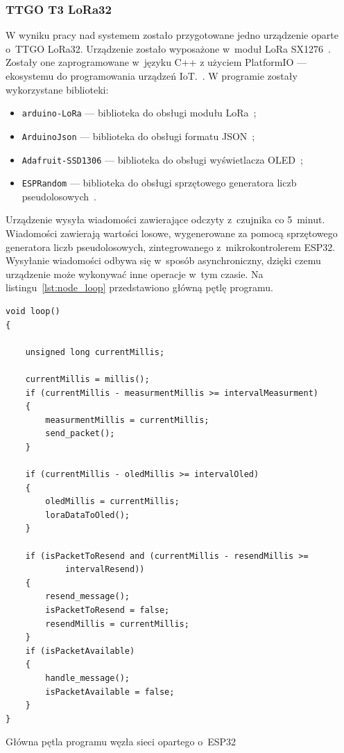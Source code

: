 \subsubsection{TTGO T3 LoRa32}
W wyniku pracy nad systemem zostało przygotowane jedno urządzenie oparte o~TTGO LoRa32.
Urządzenie zostało wyposażone w~moduł LoRa SX1276~\cite{ESP32:sx1276-doc}.
Zostały one zaprogramowane w~języku C++ z użyciem PlatformIO — ekosystemu do programowania urządzeń IoT.~\cite{tool:pio}.
W programie zostały wykorzystane biblioteki:
\begin{itemize}
    \item \texttt{arduino-LoRa} — biblioteka do obsługi modułu LoRa~\cite{ESP32:lora-lib};
    \item \texttt{ArduinoJson} — biblioteka do obsługi formatu JSON~\cite{ESP32:ArduinoJson};
    \item \texttt{Adafruit-SSD1306} — biblioteka do obsługi wyświetlacza OLED~\cite{ESP32:Adafruit-SSD1306};
    \item \texttt{ESPRandom} — biblioteka do obsługi sprzętowego generatora liczb pseudolosowych~\cite{ESP32:ESPRandom}.
\end{itemize}
Urządzenie wysyła wiadomości zawierające odczyty z~czujnika co 5~minut.
Wiadomości zawierają wartości losowe, wygenerowane za pomocą sprzętowego generatora liczb pseudolosowych, zintegrowanego z~mikrokontrolerem ESP32.
Wysyłanie wiadomości odbywa się w~sposób asynchroniczny, dzięki czemu urządzenie może wykonywać inne operacje w~tym czasie. Na listingu~\ref{lst:node_loop} przedstawiono główną pętlę programu.

\begin{lstfloat}[h!]
    \lstset{language=C++}
    \begin{lstlisting}[frame=single]
void loop()
{

    unsigned long currentMillis;

    currentMillis = millis();
    if (currentMillis - measurmentMillis >= intervalMeasurment)
    {
        measurmentMillis = currentMillis;
        send_packet();
    }

    if (currentMillis - oledMillis >= intervalOled)
    {
        oledMillis = currentMillis;
        loraDataToOled();
    }

    if (isPacketToResend and (currentMillis - resendMillis >= 
            intervalResend))
    {
        resend_message();
        isPacketToResend = false;
        resendMillis = currentMillis;
    }
    if (isPacketAvailable)
    {
        handle_message();
        isPacketAvailable = false;
    }
}   
\end{lstlisting}
    \caption{Główna pętla programu węzła sieci opartego o~ESP32}\label{lst:node_loop}
\end{lstfloat}

